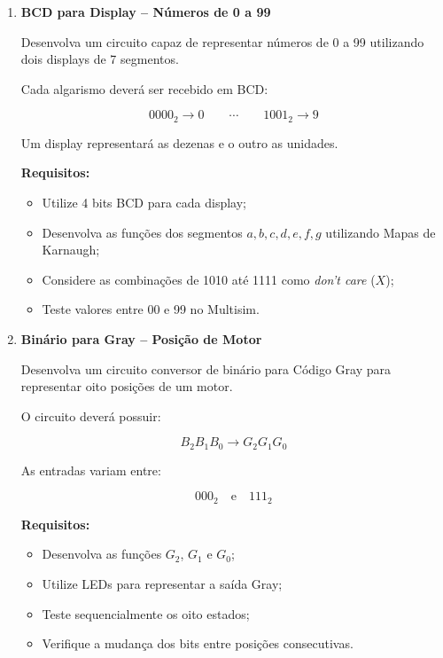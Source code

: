 \documentclass[a4paper,12pt]{article}
\begin{document}
\begin{enumerate}[leftmargin=*]


\item \textbf{BCD para Display -- Números de 0 a 99}

Desenvolva um circuito capaz de representar números de 0 a 99
utilizando dois displays de 7 segmentos.

Cada algarismo deverá ser recebido em BCD:

\[
0000_2 \rightarrow 0
\qquad \cdots \qquad
1001_2 \rightarrow 9
\]

Um display representará as dezenas e o outro as unidades.

\textbf{Requisitos:}

\begin{itemize}
    \item Utilize 4 bits BCD para cada display;
    \item Desenvolva as funções dos segmentos
    $a,b,c,d,e,f,g$ utilizando Mapas de Karnaugh;
    \item Considere as combinações de 1010 até 1111 como
    \textit{don't care} ($X$);
    \item Teste valores entre 00 e 99 no Multisim.
\end{itemize}

\vspace{0.4cm}


\item \textbf{Binário para Gray -- Posição de Motor}

Desenvolva um circuito conversor de binário para Código Gray para
representar oito posições de um motor.

O circuito deverá possuir:

\[
B_2B_1B_0
\longrightarrow
G_2G_1G_0
\]

As entradas variam entre:

\[
000_2 \quad \text{e} \quad 111_2
\]

\textbf{Requisitos:}

\begin{itemize}
    \item Desenvolva as funções $G_2$, $G_1$ e $G_0$;
    \item Utilize LEDs para representar a saída Gray;
    \item Teste sequencialmente os oito estados;
    \item Verifique a mudança dos bits entre posições consecutivas.
\end{itemize}


\end{enumerate}
\end{document}
